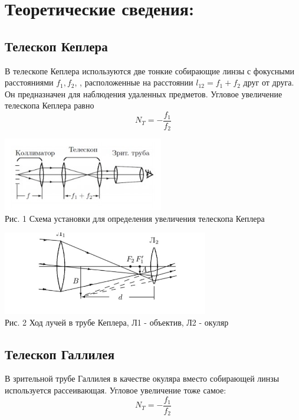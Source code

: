 \documentclass[14pt,a4paper]{scrartcl}
\begin{document}
\newpage
\section{Теоретические сведения:}
\subsection{Телескоп Кеплера}

В телескопе Кеплера используются две тонкие собирающие линзы с фокусными расстояниями $f_1, f_2$, , расположенные на расстоянии $l_{12}=f_{1}+f_{2}$ друг от друга. Он предназначен для наблюдения удаленных предметов. Угловое увеличение телескопа Кеплера равно $$N_{T}=-\frac{f_{1}}{f_{2}}$$
\begin{center}
  \includegraphics[width = 7cm]{труба кеплера.jpg}\\
  Рис. 1 Схема установки для определения увеличения телескопа Кеплера
 
\end{center}

\begin{center}
  \includegraphics[width = 9cm]{ход лучей в кеплере.jpg}\\
  Рис. 2 Ход лучей в трубе Кеплера,
Л1 - объектив, Л2 - окуляр
\end{center}




\subsection{Телескоп Галлилея}

В зрительной трубе Галлилея в качестве окуляра вместо собирающей линзы используется
рассеивающая. Угловое увеличение тоже самое:
$$N_{T}=-\frac{f_{1}}{f_{2}}$$
\end{document}

